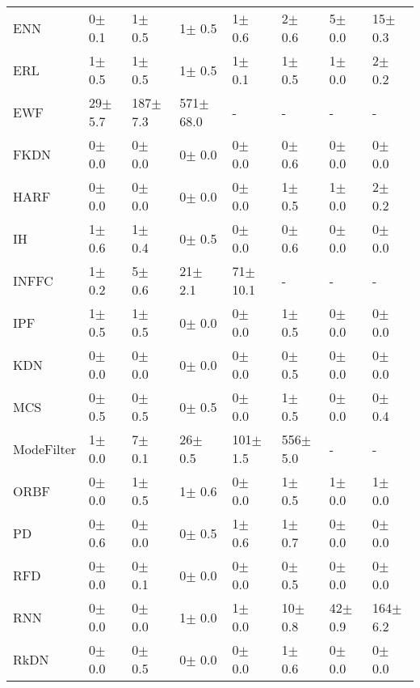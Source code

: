\begin{tabular}{llllllll}
ENN              &   0$\pm$ 0.1 &     1$\pm$ 0.5 &     1$\pm$ 0.5 &    1$\pm$ 0.6 &     2$\pm$ 0.6 &   5$\pm$ 0.0 &   15$\pm$ 0.3 \\
ERL              &   1$\pm$ 0.5 &     1$\pm$ 0.5 &     1$\pm$ 0.5 &    1$\pm$ 0.1 &     1$\pm$ 0.5 &   1$\pm$ 0.0 &    2$\pm$ 0.2 \\
EWF              &  29$\pm$ 5.7 &   187$\pm$ 7.3 &  571$\pm$ 68.0 &             - &              - &            - &             - \\
FKDN             &   0$\pm$ 0.0 &     0$\pm$ 0.0 &     0$\pm$ 0.0 &    0$\pm$ 0.0 &     0$\pm$ 0.6 &   0$\pm$ 0.0 &    0$\pm$ 0.0 \\
HARF             &   0$\pm$ 0.0 &     0$\pm$ 0.0 &     0$\pm$ 0.0 &    0$\pm$ 0.0 &     1$\pm$ 0.5 &   1$\pm$ 0.0 &    2$\pm$ 0.2 \\
IH               &   1$\pm$ 0.6 &     1$\pm$ 0.4 &     0$\pm$ 0.5 &    0$\pm$ 0.0 &     0$\pm$ 0.6 &   0$\pm$ 0.0 &    0$\pm$ 0.0 \\
INFFC            &   1$\pm$ 0.2 &     5$\pm$ 0.6 &    21$\pm$ 2.1 &  71$\pm$ 10.1 &              - &            - &             - \\
IPF              &   1$\pm$ 0.5 &     1$\pm$ 0.5 &     0$\pm$ 0.0 &    0$\pm$ 0.0 &     1$\pm$ 0.5 &   0$\pm$ 0.0 &    0$\pm$ 0.0 \\
KDN              &   0$\pm$ 0.0 &     0$\pm$ 0.0 &     0$\pm$ 0.0 &    0$\pm$ 0.0 &     0$\pm$ 0.5 &   0$\pm$ 0.0 &    0$\pm$ 0.0 \\
MCS              &   0$\pm$ 0.5 &     0$\pm$ 0.5 &     0$\pm$ 0.5 &    0$\pm$ 0.0 &     1$\pm$ 0.5 &   0$\pm$ 0.0 &    0$\pm$ 0.4 \\
ModeFilter       &   1$\pm$ 0.0 &     7$\pm$ 0.1 &    26$\pm$ 0.5 &  101$\pm$ 1.5 &   556$\pm$ 5.0 &            - &             - \\
ORBF             &   0$\pm$ 0.0 &     1$\pm$ 0.5 &     1$\pm$ 0.6 &    0$\pm$ 0.0 &     1$\pm$ 0.5 &   1$\pm$ 0.0 &    1$\pm$ 0.0 \\
PD               &   0$\pm$ 0.6 &     0$\pm$ 0.0 &     0$\pm$ 0.5 &    1$\pm$ 0.6 &     1$\pm$ 0.7 &   0$\pm$ 0.0 &    0$\pm$ 0.0 \\
RFD              &   0$\pm$ 0.0 &     0$\pm$ 0.1 &     0$\pm$ 0.0 &    0$\pm$ 0.0 &     0$\pm$ 0.5 &   0$\pm$ 0.0 &    0$\pm$ 0.0 \\
RNN              &   0$\pm$ 0.0 &     0$\pm$ 0.0 &     1$\pm$ 0.0 &    1$\pm$ 0.0 &    10$\pm$ 0.8 &  42$\pm$ 0.9 &  164$\pm$ 6.2 \\
RkDN             &   0$\pm$ 0.0 &     0$\pm$ 0.5 &     0$\pm$ 0.0 &    0$\pm$ 0.0 &     1$\pm$ 0.6 &   0$\pm$ 0.0 &    0$\pm$ 0.0 \\

\end{tabular}
